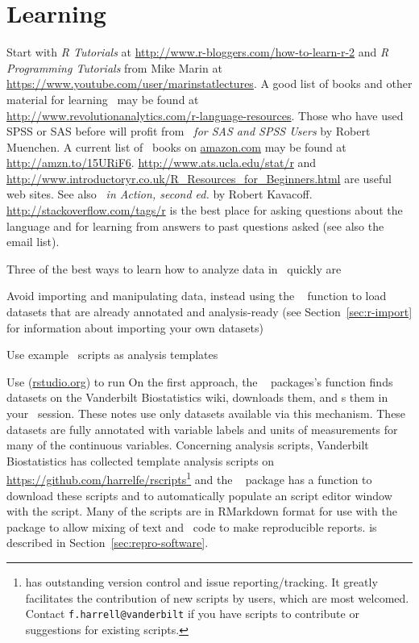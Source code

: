 \section{Learning \R}
Start with \emph{R Tutorials} at \url{http://www.r-bloggers.com/how-to-learn-r-2} and \emph{R Programming Tutorials} from Mike Marin at
\url{https://www.youtube.com/user/marinstatlectures}.
A good list of books and other material for learning \R\ may be found at\\
\url{http://www.revolutionanalytics.com/r-language-resources}.  Those
who have used SPSS or SAS before will profit from \emph{\R\ for SAS
  and SPSS Users} by Robert Muenchen.  A current list of \R\ books on
\href{https://www.amazon.com/}{amazon.com} may be found at \url{http://amzn.to/15URiF6}.
\url{http://www.ats.ucla.edu/stat/r} and
\url{http://www.introductoryr.co.uk/R_Resources_for_Beginners.html}
are useful web sites. See also \emph{\R\ in Action, second ed.} by Robert 
Kavacoff.
\url{http://stackoverflow.com/tags/r} is the best place for asking
questions about the language and for learning from answers to past questions
asked (see also the  email list).

Three of the best ways to learn how to analyze data in \R\ quickly are
\be
\item Avoid importing and manipulating data, instead using the \R\
   function to load datasets that are already annotated and
  analysis-ready (see Section~\ref{sec:r-import} for information about
  importing your own datasets)
\item Use example \R\ scripts as analysis templates
\item Use  (\href{https://www.rstudio.com/}{rstudio.org}) to run \R
\ee
On the first approach, the \R\  packages's 
function finds datasets on the Vanderbilt Biostatistics 
wiki, downloads them, and \co{load()}s them in your \R\ session.
These notes use only datasets available via this mechanism.  These
datasets are fully annotated with variable labels and units of
measurements for many of the continuous variables.
Concerning analysis scripts, Vanderbilt Biostatistics has collected
template analysis scripts on
\url{https://github.com/harrelfe/rscripts}\footnote{ has
  outstanding version control and issue reporting/tracking.  It
  greatly facilitates the contribution of new scripts by users, which
  are most welcomed.  Contact \texttt{f.harrell@vanderbilt} if you
  have scripts to contribute or suggestions for existing scripts.} and
the \R\ \co{Hmisc} package has a function \co{getRs} to download these
scripts and to automatically populate an 
 script editor window with the script.
Many of the scripts are in RMarkdown format for use with the \R\
 package to allow mixing of text and \R\ code to make
reproducible reports.  \co{knitr} is described in 
Section~\ref{sec:repro-software}.

